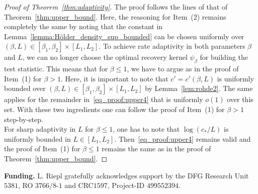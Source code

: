 \documentclass[10.5pt,letter]{article}
\numberwithin{equation}{section}
\theoremstyle{definition}
\newcommand{\1}{\mathbbm{1}}
\begin{document}
\begin{proof}[Proof of Theorem~\ref{thm:adaptivity}]
    The proof follows the lines of that of Theorem~\ref{thm:upper_bound}. Here, the reasoning for Item~(2) remains completely the same by noting that the constant in Lemma~\ref{lemma:Hölder_density_sup_bounded} can be chosen uniformly over $(\beta,L)\in[\beta_1,\beta_2]\times[L_1,L_2]$. To achieve rate adaptivity in both parameters $\beta$ and $L$, we can no longer choose the optimal recovery kernel $\psi_\beta$ for building the test statistic. This means that for $\beta\leq 1$, we have to argue as in the proof of Item~(1) for $\beta>1$. Here, it is important to note that $c'=c'(\beta,L)$ is uniformly bounded over $(\beta,L)\in [\beta_1,\beta_2]\times [L_1,L_2]$ by Lemma~\ref{lem:rohde2}. The same applies for the remainder in~\eqref{eq_proof:upper4} that is uniformly $o(1)$ over this set. With these two ingredients one can follow the proof of Item~(1) for $\beta>1$ step-by-step.\\
    For sharp adaptivity in $L$ for $\beta\leq 1$, one has to note that $\log(c_*/L)$ is uniformly bounded in $L\in [L_1,L_2]$. Then~\eqref{eq_proof:upper4} remains valid and the proof of Item~(1) for $\beta\leq 1$ remains the same as in the proof of Theorem~\ref{thm:upper_bound}.
\end{proof}



\textbf{Funding.} 
L. Riepl gratefully acknowledges support by the DFG Research Unit $5381$, RO $3766/8$-$1$ and CRC$ 1597$, Project-ID $499552394$.






\end{document}
